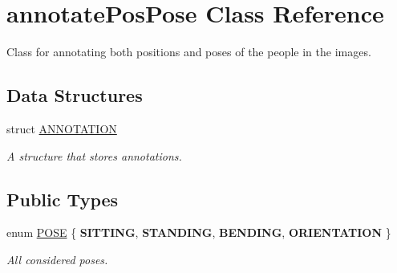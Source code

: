\hypertarget{classannotatePosPose}{
\section{annotatePosPose Class Reference}
\label{classannotatePosPose}
}


Class for annotating both positions and poses of the people in the images.  


\subsection*{Data Structures}
\begin{DoxyCompactItemize}
\item 
struct \hyperlink{structannotatePosPose_1_1ANNOTATION}{ANNOTATION}
\begin{DoxyCompactList}\small\item\em A structure that stores annotations. \item\end{DoxyCompactList}\end{DoxyCompactItemize}
\subsection*{Public Types}
\begin{DoxyCompactItemize}
\item 
enum \hyperlink{classannotatePosPose_a7a9e324ff6c85eeb2c2bd91b2b8cbdba}{POSE} \{ {\bfseries SITTING}, 
{\bfseries STANDING}, 
{\bfseries BENDING}, 
{\bfseries ORIENTATION}
 \}
\begin{DoxyCompactList}\small\item\em All considered poses. \item\end{DoxyCompactList}\end{DoxyCompactItemize}
